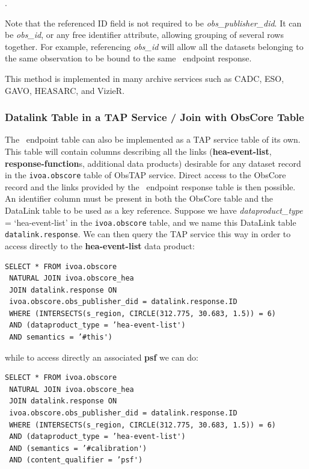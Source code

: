 .

\noindent Note that the referenced ID field is not required to be  {\em obs\_publisher\_did\/}. It can be  {\em obs\_id\/}, or any free identifier attribute, allowing grouping of several rows together. For example, referencing {\em obs\_id\/} will allow all the datasets belonging to the same observation to be bound to the same \blinks\ endpoint response.
      	
This method is implemented in many archive services such as CADC, ESO, GAVO, HEASARC, and VizieR.    
	
 \subsubsection{Datalink Table in a TAP  Service / Join with ObsCore Table}
 \label{sec:datalinktap}

The \blinks\ endpoint table can also be implemented as a TAP service table of its own. This table will contain  columns describing  all the links ({\bf hea-event-list}, {\bf response-function}s, additional data products) desirable for any dataset record in the {\tt ivoa.obscore} table of ObsTAP service.
Direct access to the ObsCore record and the links provided by the \blinks\ endpoint response table is then possible. An identifier column must be present in both the ObsCore table and the DataLink table to be used as a key reference. Suppose we have  {\em dataproduct\_type} = `hea-event-list' in the {\tt ivoa.obscore} table, and we name this DataLink table {\tt datalink.response}\null. We can then query the TAP service this way in order to access directly to the {\bf hea-event-list} data product:

\smallskip
{\small
\begin{verbatim}
SELECT * FROM ivoa.obscore
 NATURAL JOIN ivoa.obscore_hea
 JOIN datalink.response ON
 ivoa.obscore.obs_publisher_did = datalink.response.ID
 WHERE (INTERSECTS(s_region, CIRCLE(312.775, 30.683, 1.5)) = 6)
 AND (dataproduct_type = ’hea-event-list')
 AND semantics = ’#this')
\end{verbatim}
}

\noindent while to access directly an associated {\bf psf} we can do:

{\small
\begin{verbatim}
SELECT * FROM ivoa.obscore
 NATURAL JOIN ivoa.obscore_hea
 JOIN datalink.response ON 
 ivoa.obscore.obs_publisher_did = datalink.response.ID
 WHERE (INTERSECTS(s_region, CIRCLE(312.775, 30.683, 1.5)) = 6)
 AND (dataproduct_type = ’hea-event-list')
 AND (semantics = ’#calibration')
 AND (content_qualifier = ’psf')
\end{verbatim}
}

